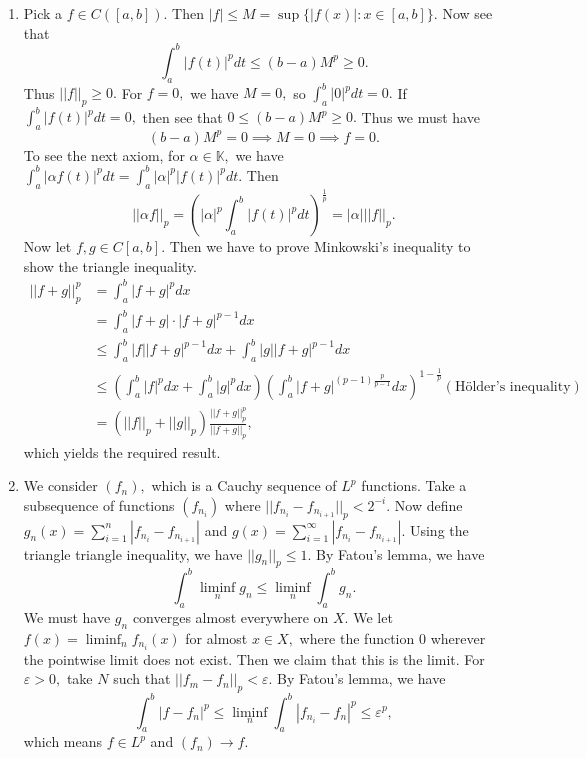 \documentclass{article}
\begin{document}
\section{} %
\begin{enumerate}
	\item Pick a $f \in C([a,b]).$ Then $|f|\leq M=\sup\{|f(x)|:x \in [a,b]\}.$ Now see that $$\int_a^b|f(t)|^pdt \leq (b-a)M^p \geq 0.$$ Thus $||f||_p \geq 
	0.$
	For $f=0,$ we have $M=0,$ so $\int_a^b|0|^pdt=0.$ If $\int_a^b|f(t)|^pdt =0,$ then see that $0 \leq (b-a)M^p \geq 0.$ Thus we must have $$(b-a)M^p=0 
	\implies M=0 \implies f=0.$$ To see the next axiom, for $\alpha \in \mathbb{K},$ we have $\int_a^b|\alpha f(t)|^pdt =\int_a^b|\alpha|^p|f(t)|^pdt.$
	Then $$||\alpha f||_p= \left(|\alpha|^p\int_a^b|f(t)|^pdt\right)^{\frac{1}{p}} =|\alpha| ||f||_p.$$
	Now let $f,g \in C[a,b].$ Then we have to prove Minkowski's inequality to show the triangle inequality. 
	\begin{align*}
		||f+g||^p_p &= \int_{a}^b |f+g|^p dx\\
		&= \int_{a}^b |f+g|\cdot|f+g|^{p-1} dx\\
		&\leq \int_{a}^b |f||f+g|^{p-1} dx + \int_{a}^b |g||f+g|^{p-1} dx\\
		&\leq \left(\int_{a}^b |f|^{p} dx+\int_{a}^b |g|^{p} dx\right)\left(\int_{a}^b |f+g|^{(p-1)\frac{p}{p-1}} dx \right)^{1-\frac{1}{p}} 
		(\text{H\"{o}lder's inequality})\\
		&= (||f||_p+||g||_p)\frac{||f+g||_p^p}{||f+g||_p},
	\end{align*}
	which yields the required result.
	\item We consider $(f_n),$ which is a Cauchy sequence of $L^p$ functions. Take a subsequence of functions $(f_{n_i})$ where 
	$||f_{n_{i}} -f_{n_{i+1}}||_p < 2^{-i}.$ Now define $g_n(x)= \sum_{i=1}^{n}|f_{n_{i}} -f_{n_{i+1}}|$ and $g(x)= \sum_{i=1}^{\infty}|f_{n_{i}} 
	-f_{n_{i+1}}|.$  Using the triangle triangle inequality, we have $||g_n||_p \leq 1.$ By Fatou's lemma, we have 
	$$\int_{a}^b \liminf_{n} g_n \leq \liminf_{n} \int_{a}^b g_n.$$ 
	We must have $g_n$ converges almost everywhere on $X.$ We let $f(x) = \liminf_{n} f_{n_i}(x)$ for almost $x \in X,$ where the function $0$ wherever the 
	pointwise limit does not exist. Then we claim that this is the limit. 
	For $\varepsilon>0,$ take $N$ such that $||f_m-f_n||_p< \varepsilon$. By Fatou's lemma, we have 
	$$ \int_{a}^b |f-f_n|^p \leq \liminf_{n} \int_{a}^b |f_{n_i}-f_n|^p \leq \varepsilon^p,$$ which means $f \in L^p$ and $(f_n) \to f.$
	

\end{enumerate}
\end{document}
